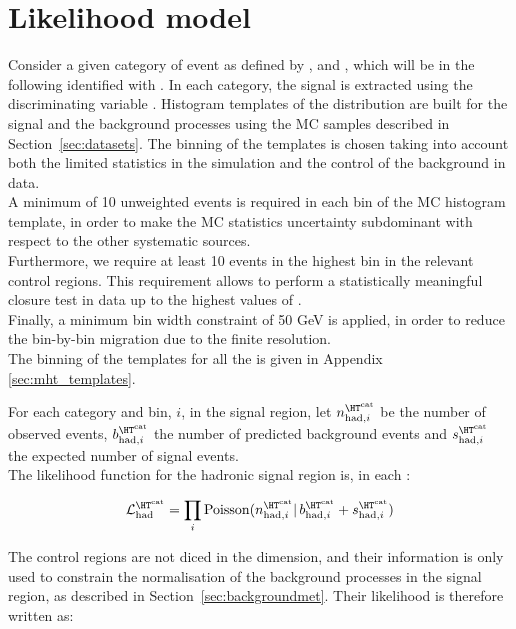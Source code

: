 \section{Likelihood model}
\label{sec:likelihood}

Consider a given category of event as defined by \njet, \nb and \scalht, which will be in the following identified with \htcat. 
In each category, the signal is extracted using the discriminating variable \mht. 
Histogram templates of the \mht distribution are built for the signal and the background processes 
using the MC samples described in Section~\ref{sec:datasets}. 
The binning of the templates is chosen taking into account both the limited statistics in the simulation and 
the control of the background in data. \\
A minimum of 10 unweighted events is required in each bin of the MC histogram template, 
in order to make the MC statistics uncertainty subdominant with respect to the other systematic sources. \\
Furthermore, we require at least 10 events in the highest bin in the relevant control regions.
This requirement allows to perform a statistically meaningful closure test in data up to the highest values of \mht.\\
Finally, a minimum bin width constraint of 50 GeV is applied, 
in order to reduce the bin-by-bin migration due to the finite \mht resolution.\\
The binning of the \mht templates for all the \htcat is given in Appendix \ref{sec:mht_templates}.


For each category \htcat and \mht bin, $i$, in the signal region, let $n^{\htcat}_{\mathrm{had},i}$ be the number of observed events, $b^{\htcat}_{\mathrm{had},i}$ the number of predicted background events and $s^{\htcat}_{\mathrm{had},i}$ the expected number of signal events. \\
The likelihood function for the hadronic signal region is, in each \htcat:

\begin{equation}
\mathcal{L}^{\htcat}_{\mathrm{had}}=\prod_i \mathrm{Poisson}(n^{\htcat}_{\mathrm{had},i} |\, b^{\htcat}_{\mathrm{had},i} + s^{\htcat}_{\mathrm{had},i})
\label{eq:hadronicLikelihood}
\end{equation}

The control regions are not diced in the \mht dimension, and their information is only used to constrain the normalisation of the background processes 
in the signal region, as described in Section~\ref{sec:backgroundmet}. 
Their likelihood is therefore written as:

